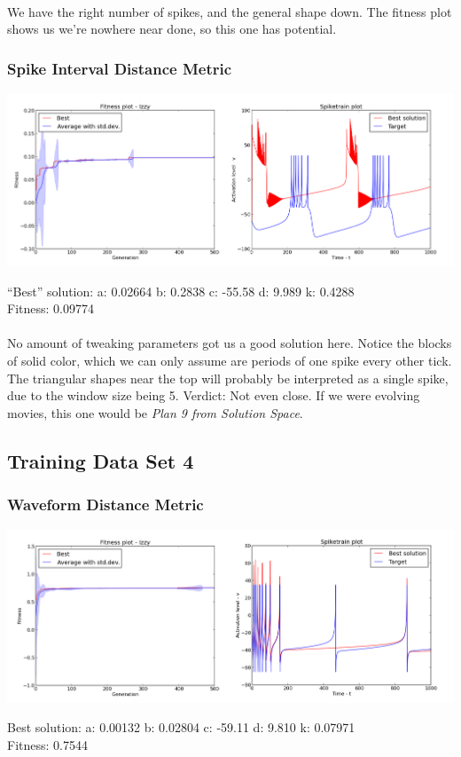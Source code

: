 \documentclass[a4paper,12pt]{article}
\begin{document}
\paragraph{}We have the right number of spikes, and the general shape down. The fitness plot shows us we're nowhere near done, so this one has potential.

\subsubsection{Spike Interval Distance Metric}
\centerline{\includegraphics[width=1.3\textwidth]{img/case3_int}}
``Best'' solution: 
a: 0.02664 
b: 0.2838 
c: -55.58 
d: 9.989 
k: 0.4288 \\
Fitness: 0.09774
\paragraph{}No amount of tweaking parameters got us a good solution here. Notice the blocks of solid color, which we can only assume are periods of one spike every other tick. The triangular shapes near the top will probably be interpreted as a single spike, due to the window size being 5. Verdict: Not even close. If we were evolving movies, this one would be \textit{Plan 9 from Solution Space}.

\subsection{Training Data Set 4}
\subsubsection{Waveform Distance Metric}
\centerline{\includegraphics[width=1.3\textwidth]{img/case4_wave}}
Best solution: 
a: 0.00132 
b: 0.02804 
c: -59.11 
d: 9.810 
k: 0.07971 \\
Fitness: 0.7544
\end{document}

